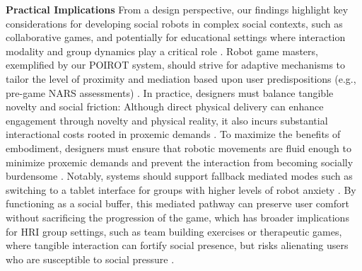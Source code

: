 \documentclass[sigconf,screen]{acmart-tagged}
\begin{document}
\noindent \textbf{Practical Implications}
From a design perspective, our findings highlight key considerations for developing social robots in complex social contexts, such as collaborative games, and potentially for educational settings where interaction modality and group dynamics play a critical role \cite{lin2022benefits, gillet2020social, haripriyan2024human}. Robot game masters, exemplified by our POIROT system, should strive for adaptive mechanisms to tailor the level of proximity and mediation based upon user predispositions (e.g., pre-game NARS assessments) \cite{buracchio2025impact, gillet2020social, obaid2016stop, gillet2021robot}. In practice, designers must balance tangible novelty and social friction: Although direct physical delivery can enhance engagement through novelty and physical reality, it also incurs substantial interactional costs rooted in proxemic demands \cite{lin2022benefits, samarakoon2022review, smedegaard2019reframing}. To maximize the benefits of embodiment, designers must ensure that robotic movements are fluid enough to minimize proxemic demands and prevent the interaction from becoming socially burdensome \cite{gonccalves2024non, neto2023robot, Su2023RecentAI}. Notably, systems should support fallback mediated modes such as switching to a tablet interface for groups with higher levels of robot anxiety \cite{rosenberg2020robot, shamekhi2019multimodal}. By functioning as a social buffer, this mediated pathway can preserve user comfort without sacrificing the progression of the game, which has broader implications for HRI group settings, such as team building exercises or therapeutic games, where tangible interaction can fortify social presence, but risks alienating users who are susceptible to social pressure \cite{lin2022benefits, gillet2020social, oh2018systematic, yuliawati2024scoping}.

\vspace{-10pt}
\end{document}
